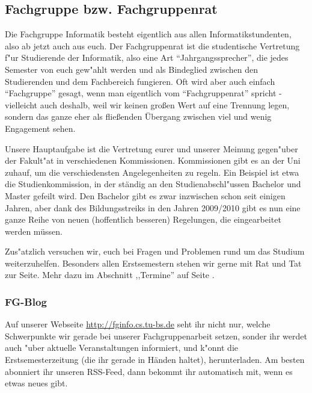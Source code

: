 \subsection{Fachgruppe bzw. Fachgruppenrat}
\label{fachgruppe}

Die Fachgruppe Informatik besteht eigentlich aus allen 
Informatikstundenten, also ab jetzt auch aus euch. Der Fachgruppenrat 
ist die studentische Vertretung f"ur Studierende der Informatik, also 
eine Art "`Jahrgangssprecher"', die jedes Semester von euch gew"ahlt werden 
und als Bindeglied zwischen den Studierenden und dem Fachbereich 
fungieren. Oft wird aber auch einfach "`Fachgruppe"' gesagt, wenn man 
eigentlich vom "`Fachgruppenrat"' spricht - vielleicht auch deshalb, 
weil wir keinen großen Wert auf eine Trennung legen, sondern das ganze
eher als fließenden Übergang zwischen viel und wenig Engagement sehen.

Unsere Hauptaufgabe ist die Vertretung eurer und unserer Meinung 
gegen"uber der Fakult"at in verschiedenen Kommissionen. Kommissionen 
gibt es an der Uni zuhauf, um die verschiedensten Angelegenheiten zu 
regeln. Ein Beispiel ist etwa die Studienkommission, in der ständig 
an den Studienabschl"ussen Bachelor und Master gefeilt wird. Den Bachelor 
gibt es zwar inzwischen schon seit einigen Jahren, aber dank des 
Bildungsstreiks in den Jahren 2009/2010 gibt es nun eine ganze Reihe %
von neuen (hoffentlich besseren) Regelungen, die eingearbeitet werden 
müssen.

Zus"atzlich versuchen wir, euch bei Fragen und Problemen rund um das 
Studium weiterzuhelfen. Besonders allen Erstsemestern stehen wir 
gerne mit Rat und Tat zur Seite.  Mehr dazu im Abschnitt ,,Termine'' auf
Seite \pageref{termine}.

\subsubsection*{FG-Blog}

Auf unserer Webseite \url{http://fginfo.cs.tu-bs.de} seht ihr nicht 
nur, welche Schwerpunkte wir gerade bei unserer Fachgruppenarbeit setzen, 
sonder ihr werdet auch "uber aktuelle Veranstaltungen informiert, und k"onnt 
die Erstsemesterzeitung (die ihr gerade in Händen haltet), herunterladen. 
Am besten abonniert ihr unseren RSS-Feed, dann bekommt ihr automatisch 
mit, wenn es etwas neues gibt.

